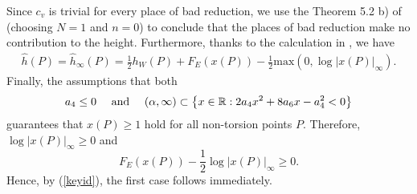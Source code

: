 \documentclass[12pt]{amsart}
\newcommand{\R}{\mathbb{R}}
\numberwithin{equation}{section}
\begin{document}
Since $c_v$ is trivial for every place of bad reduction, we use the Theorem 5.2 b) of \cite{Silverman88} (choosing $N=1$ and $n=0$)   to conclude that the places of bad reduction make no contribution to the height.
Furthermore, thanks to the calculation in \cite[p. 475]{BGZ}, we have 
\begin{align}\label{keyid}
    \widehat{h}(P)=\widehat{h}_{\infty}(P)=\frac{1}{2}h_W(P)+F_{E}(x(P))-\frac{1}{2}\textrm{max}(0,\log|x(P)|_{\infty}).
\end{align}
Finally, the assumptions that both
$$ a_4\leq 0 \ \ \ \ {\text {\rm and}}\ \ \ \  (\alpha,\infty)\subset\left\{x\in \R:2a_4x^2+8a_6x-a_4^2<0\right\}$$
guarantees that $x(P)\geq 1$ hold for all non-torsion points $P.$ Therefore, $\log|x(P)|_{\infty}\geq 0$ and 
$$F_{E}(x(P))-\frac{1}{2}\log|x(P)|_{\infty}\geq0.$$
Hence, by (\ref{keyid}), the first case follows immediately.
\end{document}
